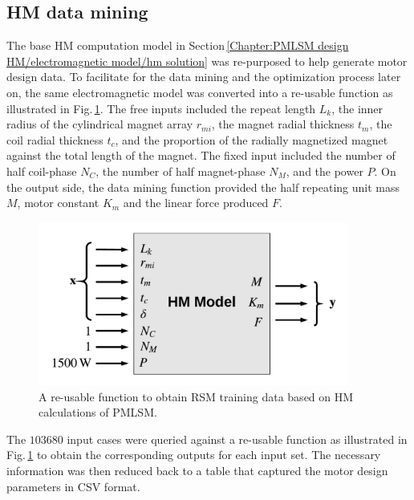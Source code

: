         \subsection{HM data mining}           \label{Chapter:RSM/PMLSM/data mining}
        
        
            The base \acs{HM} computation model in Section\,\ref{Chapter:PMLSM design HM/electromagnetic model/hm solution} was re-purposed to help generate motor design data. To facilitate for the data mining and the optimization process later on, the same electromagnetic model was converted into a re-usable function as illustrated in Fig.\,\ref{fig:chapter/rsm/PMLSM/mining process}. The free inputs included the repeat length $L_k$, the inner radius of the cylindrical magnet array $r_{mi}$, the magnet radial thickness $t_m$, the coil radial thickness $t_c$, and the proportion of the radially magnetized magnet against the total length of the magnet. The fixed input included the number of half coil-phase $N_C$, the number of half magnet-phase $N_M$, and the power $P$. On the output side, the data mining function provided the half repeating unit mass $M$, motor constant $K_m$ and the linear force produced $F$.
        
        
            \begin{figure}
                \centering
                \includegraphics[width=4in]{chap4/images/HM_mining_for_PMLSM.pdf}
                \caption{A re-usable function to obtain RSM training data based on HM calculations of PMLSM.}
                \label{fig:chapter/rsm/PMLSM/mining process}
            \end{figure}
            
            
            The $103680$ input cases were queried against a re-usable function as illustrated in Fig.\,\ref{fig:chapter/rsm/PMLSM/mining process} to obtain the corresponding outputs for each input set. The necessary information was then reduced back to a table that captured the motor design parameters in CSV format. 
            
